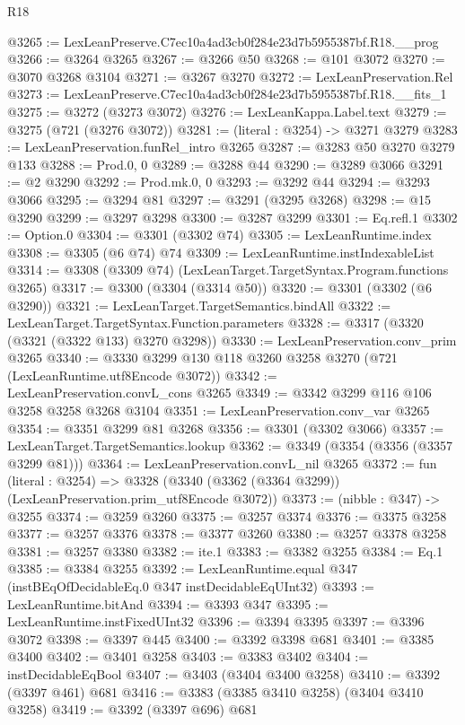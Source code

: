 \begin{lexlean}{R18}
\begin{coremodule}
@3265 := LexLeanPreserve.C7ec10a4ad3cb0f284e23d7b5955387bf.R18.__prog
@3266 := @3264 @3265
@3267 := @3266 @50
@3268 := @101 @3072
@3270 := @3070 @3268 @3104
@3271 := @3267 @3270
@3272 := LexLeanPreservation.Rel
@3273 := LexLeanPreserve.C7ec10a4ad3cb0f284e23d7b5955387bf.R18.__fits_1
@3275 := @3272 (@3273 @3072)
@3276 := LexLeanKappa.Label.text
@3279 := @3275 (@721 (@3276 @3072))
@3281 := (literal : @3254) -> @3271 @3279
@3283 := LexLeanPreservation.funRel_intro @3265
@3287 := @3283 @50 @3270 @3279 @133
@3288 := Prod.{0, 0}
@3289 := @3288 @44
@3290 := @3289 @3066
@3291 := @2 @3290
@3292 := Prod.mk.{0, 0}
@3293 := @3292 @44
@3294 := @3293 @3066
@3295 := @3294 @81
@3297 := @3291 (@3295 @3268)
@3298 := @15 @3290
@3299 := @3297 @3298
@3300 := @3287 @3299
@3301 := Eq.refl.{1}
@3302 := Option.{0}
@3304 := @3301 (@3302 @74)
@3305 := LexLeanRuntime.index
@3308 := @3305 (@6 @74) @74
@3309 := LexLeanRuntime.instIndexableList
@3314 := @3308 (@3309 @74) (LexLeanTarget.TargetSyntax.Program.functions @3265)
@3317 := @3300 (@3304 (@3314 @50))
@3320 := @3301 (@3302 (@6 @3290))
@3321 := LexLeanTarget.TargetSemantics.bindAll
@3322 := LexLeanTarget.TargetSyntax.Function.parameters
@3328 := @3317 (@3320 (@3321 (@3322 @133) @3270 @3298))
@3330 := LexLeanPreservation.conv_prim @3265
@3340 := @3330 @3299 @130 @118 @3260 @3258 @3270 (@721 (LexLeanRuntime.utf8Encode @3072))
@3342 := LexLeanPreservation.convL_cons @3265
@3349 := @3342 @3299 @116 @106 @3258 @3258 @3268 @3104
@3351 := LexLeanPreservation.conv_var @3265
@3354 := @3351 @3299 @81 @3268
@3356 := @3301 (@3302 @3066)
@3357 := LexLeanTarget.TargetSemantics.lookup
@3362 := @3349 (@3354 (@3356 (@3357 @3299 @81)))
@3364 := LexLeanPreservation.convL_nil @3265
@3372 := fun (literal : @3254) =>
  @3328 (@3340 (@3362 (@3364 @3299)) (LexLeanPreservation.prim_utf8Encode @3072))
@3373 := (nibble : @347) -> @3255
@3374 := @3259 @3260
@3375 := @3257 @3374
@3376 := @3375 @3258
@3377 := @3257 @3376
@3378 := @3377 @3260
@3380 := @3257 @3378 @3258
@3381 := @3257 @3380
@3382 := ite.{1}
@3383 := @3382 @3255
@3384 := Eq.{1}
@3385 := @3384 @3255
@3392 := LexLeanRuntime.equal @347 (instBEqOfDecidableEq.{0} @347 instDecidableEqUInt32)
@3393 := LexLeanRuntime.bitAnd
@3394 := @3393 @347
@3395 := LexLeanRuntime.instFixedUInt32
@3396 := @3394 @3395
@3397 := @3396 @3072
@3398 := @3397 @445
@3400 := @3392 @3398 @681
@3401 := @3385 @3400
@3402 := @3401 @3258
@3403 := @3383 @3402
@3404 := instDecidableEqBool
@3407 := @3403 (@3404 @3400 @3258)
@3410 := @3392 (@3397 @461) @681
@3416 := @3383 (@3385 @3410 @3258) (@3404 @3410 @3258)
@3419 := @3392 (@3397 @696) @681

\end{coremodule}
\end{lexlean}
